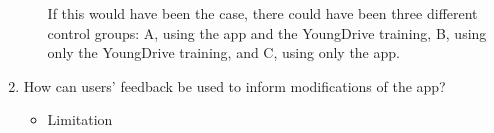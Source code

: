 \begin{enumerate}
\begin{itemize}
        If this would have been the case, there could have been three different control groups: A, using the app and the YoungDrive training, B, using only the YoungDrive training, and C, using only the app.
    \end{itemize}

    \item How can users' feedback be used to inform modifications of the app?
    \begin{itemize}
        \item Limitation 
    \end{itemize}

\end{enumerate}




